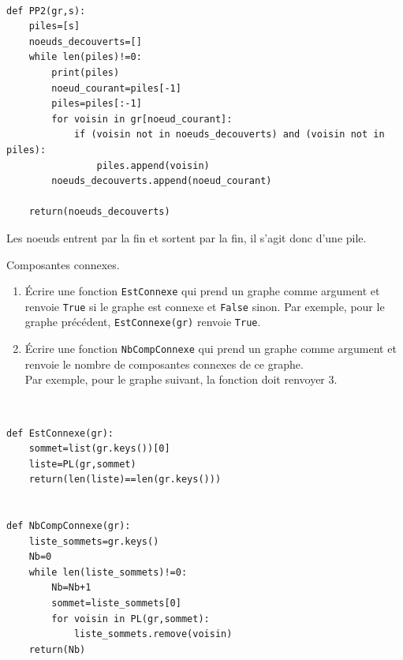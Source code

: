 \begin{solution}~\
\begin{verbatim}
def PP2(gr,s):
    piles=[s]
    noeuds_decouverts=[]
    while len(piles)!=0:
        print(piles)
        noeud_courant=piles[-1]
        piles=piles[:-1]
        for voisin in gr[noeud_courant]:
            if (voisin not in noeuds_decouverts) and (voisin not in piles):
                piles.append(voisin)   
        noeuds_decouverts.append(noeud_courant)
                
    return(noeuds_decouverts)
\end{verbatim}
Les noeuds entrent par la fin et sortent par la fin, il s'agit donc d'une pile.
\end{solution}


\begin{exercice}Composantes connexes.
\begin{enumerate}
\item Écrire une fonction \texttt{EstConnexe} qui prend un graphe comme argument et renvoie \texttt{True} si le graphe est connexe et \texttt{False} sinon.
Par exemple, pour le graphe précédent, \texttt{EstConnexe(gr)} renvoie \texttt{True}.
\item Écrire une fonction \texttt{NbCompConnexe} qui prend un graphe comme argument et renvoie le nombre de composantes connexes de ce graphe. \\
Par exemple, pour le graphe suivant, la fonction doit renvoyer 3.
\begin{center}
\end{center}
\end{enumerate}
\end{exercice}

\begin{solution}~\
\begin{verbatim}
def EstConnexe(gr):
    sommet=list(gr.keys())[0]
    liste=PL(gr,sommet)
    return(len(liste)==len(gr.keys()))


def NbCompConnexe(gr):
    liste_sommets=gr.keys()
    Nb=0
    while len(liste_sommets)!=0:
        Nb=Nb+1
        sommet=liste_sommets[0]
        for voisin in PL(gr,sommet):
            liste_sommets.remove(voisin)
    return(Nb) 
\end{verbatim}
\end{solution}

